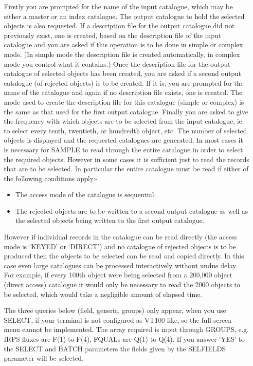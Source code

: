 Firstly you are prompted for the name of the input catalogue, which may
be either a master or an index catalogue.
The output catalogue to hold the selected objects is also requested.
If a description file for the output catalogue did not previously exist,
one is created, based on the description file of the input catalogue and
you are asked if this operation is to be done in simple or complex mode.
(In simple mode the description file is created automatically, in complex
mode you control what it contains.)
Once the description file for the output catalogue of selected objects has
been created, you are asked if a second output catalogue (of rejected
objects) is to be created.
If it is, you are prompted for the name of the catalogue and again if
no description file exists, one is created.
The mode used to create the description file for this catalogue (simple or
complex) is the same as that used for the first output catalogue.
Finally you are asked to give the frequency with which objects are to
be selected from the input catalogue, ie. to select every tenth, twentieth,
or hundredth object, etc.
The number of selected objects is displayed and the requested catalogues
are generated.
In most cases it is necessary for SAMPLE to read through the entire catalogue
in order to select the required objects.
However in some cases it is sufficient just to read the records that are
to be selected.
In particular the entire catalogue must be read if either of the following
conditions apply:-
\begin{itemize}
\item The access mode of the catalogue is sequential.
\item The rejected objects are to be written to a second output
     catalogue as well as the selected objects being written to
     the first output catalogue.
\end{itemize}
However if individual records in the catalogue can be read directly (the
access mode is `KEYED' or `DIRECT') and no catalogue of rejected objects
is to be produced then the objects to be selected can be read and copied
directly.
In this case even large catalogues can be processed interactively without
undue delay.
For example, if every 100th object were being selected from a 200,000 object
(direct access) catalogue it would only be necessary to read the 2000 objects
to be selected, which would take a negligible amount of elapsed time.

The three queries below (field, generic, groups) only appear, when you use
SELECT, if your terminal is not configured as VT100-like, so the full-screen
menu cannot be implemented.
The array required is input through GROUPS, e.g. IRPS fluxes are F(1) to
F(4), FQUALs are Q(1) to Q(4).
If you answer 'YES' to the SELECT and BATCH parameters the fields given by the
SELFIELDS parameter will be selected.

